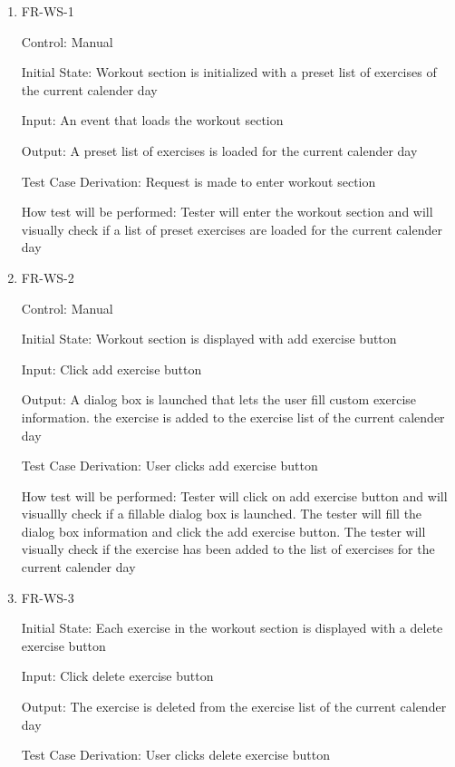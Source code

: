 \documentclass[12pt, titlepage]{article}
\begin{document}
\begin{enumerate}

\item{FR-WS-1\\}

Control: Manual
					
Initial State: Workout section is initialized with a preset list of exercises of the current calender day
					
Input: An event that loads the workout section
					
Output: A preset list of exercises is loaded for the current calender day

Test Case Derivation: Request is made to enter workout section

How test will be performed: Tester will enter the workout section and will visually check if a list of preset exercises are loaded for the current calender day
					
\item{FR-WS-2 \\}

Control: Manual
					
Initial State: Workout section is displayed with add exercise button
					
Input: Click add exercise button
					
Output: A dialog box is launched that lets the user fill custom exercise information. the exercise is added to the exercise list of the current calender day

Test Case Derivation: User clicks add exercise button

How test will be performed: Tester will click on add exercise button and will visuallly check if a fillable dialog box is launched. The tester will fill the dialog box information and click the add exercise button. The tester will visually check if the exercise has been added to the list of exercises for the current calender day

\item{FR-WS-3\\}

Initial State: Each exercise in the workout section is displayed with a delete exercise button
					
Input: Click delete exercise button
					
Output: The exercise is deleted from the exercise list of the current calender day

Test Case Derivation: User clicks delete exercise button


\end{enumerate}
\end{document}
